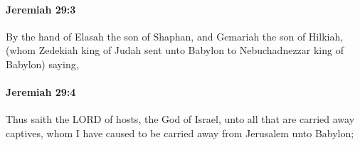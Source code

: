 		\paragraph{Jeremiah 29:3} %
			\label{JEREMIAH-29-3}

			By the hand of Elasah the son of Shaphan, and Gemariah the son of Hilkiah, (whom Zedekiah king of Judah sent unto Babylon to Nebuchadnezzar king of Babylon) saying,


		\paragraph{Jeremiah 29:4} %
			\label{JEREMIAH-29-4}

			Thus saith the LORD of hosts, the God of Israel, unto all that are carried away captives, whom I have caused to be carried away from Jerusalem unto Babylon;


